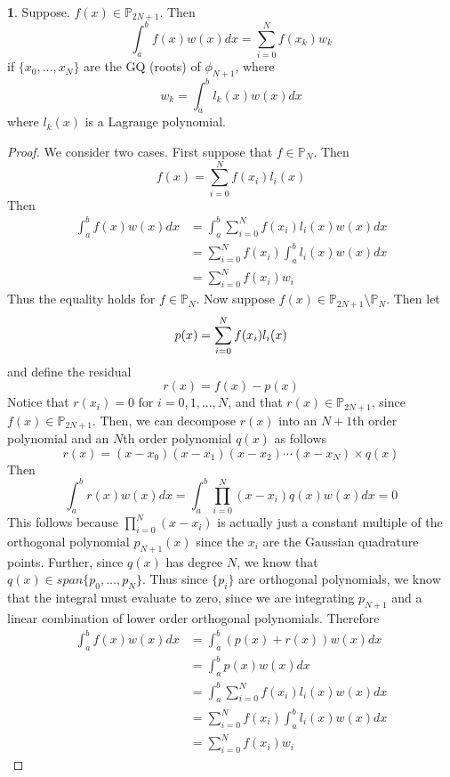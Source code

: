 \documentclass[12pt]{article}
\theoremstyle{definition}
\newtheorem{theorem}{\color{ForestGreen}{\textbf{Theorem}}}
\theoremstyle{definition}
\begin{document}
\begin{theorem}
	Suppose. $f(x) \in \mathbb{P}_{2N+1}$. Then 
	\begin{equation}
		\int_{a}^b f(x)w(x)dx = \sum_{i=0}^N f(x_k) w_k
	\end{equation}
	if $\{x_0, \ldots, x_N\}$ are the GQ (roots) of $\phi_{N+1}$, where
	\begin{equation}
		w_k = \int_a^b l_k(x)w(x)dx
	\end{equation}
	where $l_k(x)$ is a Lagrange polynomial. 
\end{theorem}
\begin{proof}
	We consider two cases. First suppose that $f \in \mathbb{P}_N$. Then
	\begin{equation}
		f(x) = \sum_{i=0}^N f(x_i)l_i(x)
	\end{equation}
	Then
	\begin{align*}
		\int_a^b f(x)w(x)dx &= \int_a^b \sum_{i=0}^N f(x_i)l_i(x) w(x) dx \\
		&= \sum_{i=0}^N f(x_i) \int_a^b l_i(x)w(x)dx \\
		&= \sum_{i=0}^N f(x_i) w_i
	\end{align*}
	Thus the equality holds for $f \in \mathbb{P}_N$. Now suppose $f(x) \in \mathbb{P}_{2N+1} \setminus \mathbb{P}_N$. Then let
	\begin{equation}
		p(x) = \sum_{i=0}^{N} f(x_i)l_i(x) \\
	\end{equation}
	and define the residual
	\begin{equation}
		r(x) = f(x) - p(x)
	\end{equation}
	Notice that $r(x_i) = 0$ for $i=0,1,\ldots,N$, and that $r(x) \in \mathbb{P}_{2N+1}$, since $f(x) \in \mathbb{P}_{2N+1}$. Then, we can decompose $r(x)$ into an $N+1$th order polynomial and an $N$th order polynomial $q(x)$ as follows
	\begin{equation}
		r(x) = (x-x_0)(x-x_1)(x-x_2)\cdots(x-x_N) \times q(x)
	\end{equation}
	Then
	\begin{equation}
		\int_a^b r(x)w(x)dx = \int_a^b \prod_{i=0}^N(x-x_i) q(x) w(x) dx = 0
 	\end{equation}
 	This follows because $\prod_{i=0}^N(x-x_i)$ is actually just a constant multiple of the orthogonal polynomial $p_{N+1}(x)$ since the $x_i$ are the Gaussian quadrature points. Further, since $q(x)$ has degree $N$, we know that $q(x) \in span\{p_0, \ldots, p_N\}$. Thus since $\{p_i\}$ are orthogonal polynomials, we know that the integral must evaluate to zero, since we are integrating $p_{N+1}$ and a linear combination of lower order orthogonal polynomials. Therefore
 	\begin{align*}
 		\int_{a}^b f(x) w(x) dx &= \int_a^b (p(x) + r(x))w(x)dx \\
 		&= \int_a^b p(x)w(x) dx \tag{since $\int_a^b r(x)w(x)dx=0$} \\
 		&= \int_a^b \sum_{i=0}^{N} f(x_i)l_i(x) w(x) dx \\
 		&= \sum_{i=0}^{N} f(x_i) \int_a^b l_i(x) w(x) dx \\
 		&= \sum_{i=0}^{N} f(x_i) w_i
 	\end{align*}
\end{proof}
\end{document}
